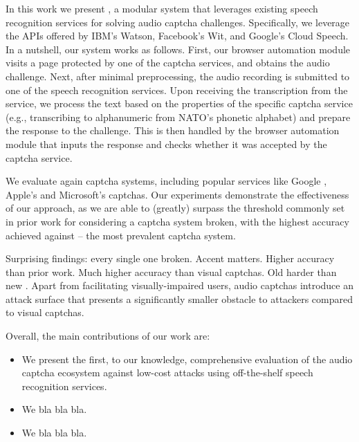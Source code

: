 In this work we present \system, a modular system that leverages existing speech recognition services
for solving audio captcha challenges. Specifically, we leverage the
APIs offered by IBM's Watson, Facebook's Wit, and Google's Cloud Speech. In a nutshell, our system works as
follows. First, our browser automation module visits a page protected by one of the captcha services,
and obtains the audio challenge. Next, after minimal preprocessing, the audio recording is submitted 
to one of the speech recognition services. Upon receiving the transcription from the service, we 
process the text based on the properties of the specific captcha service (e.g., transcribing to alphanumeric 
from NATO's phonetic alphabet) and prepare the response to the challenge. This is then handled by
the browser automation module that inputs the response and checks whether it was accepted by the captcha
service.

We evaluate \system again \no captcha systems, including popular services like Google \re,
Apple's and Microsoft's captchas. Our experiments demonstrate the effectiveness of our approach,
as we are able to (greatly) surpass the threshold commonly set in prior work for considering
a captcha system broken, with the highest accuracy achieved against \re -- the most prevalent 
captcha system.

Surprising findings: every single one broken. Accent matters. Higher accuracy than prior work. Much higher accuracy than
visual captchas. Old \re harder than new \re. 
Apart from facilitating visually-impaired users, audio captchas introduce an attack
surface that presents a significantly smaller obstacle to attackers compared to visual captchas.


Overall, the main contributions of our work are:

\begin{itemize}

\item We present the first, to our knowledge, comprehensive evaluation of 
the audio captcha ecosystem against low-cost 
attacks using off-the-shelf speech recognition services.

\item We bla bla bla.

\item We bla bla bla.

\end{itemize}
